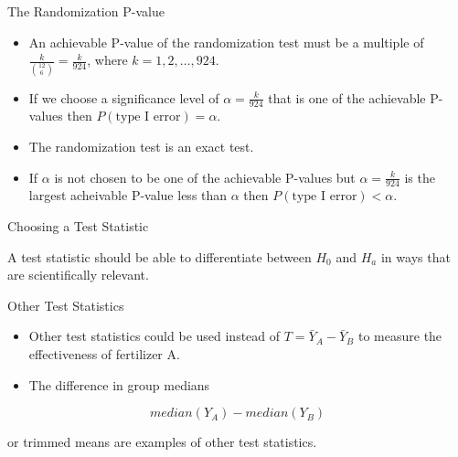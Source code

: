 \documentclass[9pt,ignorenonframetext,]{beamer}
\begin{document}
\begin{frame}{The Randomization P-value}

\begin{itemize}
\item
  An achievable P-value of the randomization test must be a multiple of
  \(\frac{k}{\binom{12}{6}} = \frac{k}{924}\), where
  \(k=1,2,\ldots,924\).
\item
  If we choose a significance level of \(\alpha=\frac{k}{924}\) that is
  one of the achievable P-values then
  \(P\left(\text{type I error}\right)=\alpha\).
\item
  The randomization test is an exact test.
\item
  If \(\alpha\) is not chosen to be one of the achievable P-values but
  \(\alpha=\frac{k}{924}\) is the largest acheivable P-value less than
  \(\alpha\) then \(P\left(\text{type I error}\right) < \alpha\).
\end{itemize}

\end{frame}

\begin{frame}{Choosing a Test Statistic}

A test statistic should be able to differentiate between \(H_0\) and
\(H_a\) in ways that are scientifically relevant.

\end{frame}

\begin{frame}{Other Test Statistics}

\begin{itemize}
\item
  Other test statistics could be used instead of
  \(T={\bar Y}_A-{\bar Y}_B\) to measure the effectiveness of fertilizer
  A.
\item
  The difference in group medians
\end{itemize}

\[median(Y_A)-median(Y_B) \]

or trimmed means are examples of other test statistics.

\end{frame}
\end{document}
